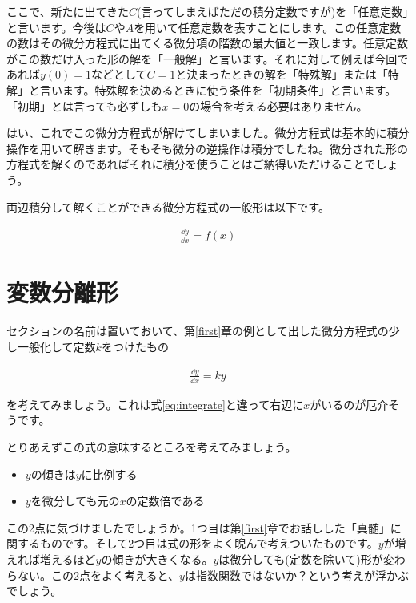ここで、新たに出てきた$C$(言ってしまえばただの積分定数ですが)を「任意定数」と言います。今後は$C$や$A$を用いて任意定数を表すことにします。この任意定数の数はその微分方程式に出てくる微分項の階数の最大値と一致します。任意定数がこの数だけ入った形の解を「一般解」と言います。それに対して例えば今回であれば$y(0)=1$などとして$C=1$と決まったときの解を「特殊解」または「特解」と言います。特殊解を決めるときに使う条件を「初期条件」と言います。「初期」とは言っても必ずしも$x=0$の場合を考える必要はありません。

はい、これでこの微分方程式が解けてしまいました。微分方程式は基本的に積分操作を用いて解きます。そもそも微分の逆操作は積分でしたね。微分された形の方程式を解くのであればそれに積分を使うことはご納得いただけることでしょう。

両辺積分して解くことができる微分方程式の一般形は以下です。

\begin{eqnarray}
    \frac{\dd y}{\dd x}=f(x)
\end{eqnarray}







\section{変数分離形}
\label{separation}
セクションの名前は置いておいて、第\ref{first}章の例として出した微分方程式の少し一般化して定数$k$をつけたもの

\begin{eqnarray}
    \frac{\dd y}{\dd x}=ky
\end{eqnarray}

\noindent
を考えてみましょう。これは式\ref{eq:integrate}と違って右辺に$x$がいるのが厄介そうです。

とりあえずこの式の意味するところを考えてみましょう。

\begin{itemize}
    \item $y$の傾きは$y$に比例する
    \item $y$を微分しても元の$x$の定数倍である
\end{itemize}

この2点に気づけましたでしょうか。1つ目は第\ref{first}章でお話しした「真髄」に関するものです。そして2つ目は式の形をよく睨んで考えついたものです。$y$が増えれば増えるほど$y$の傾きが大きくなる。$y$は微分しても(定数を除いて)形が変わらない。この2点をよく考えると、$y$は指数関数ではないか？という考えが浮かぶでしょう。


